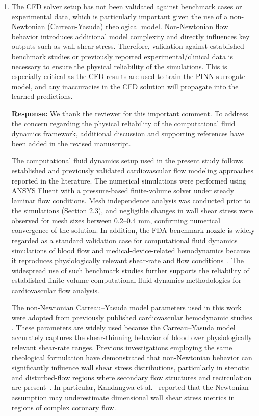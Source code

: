 \documentclass[11pt]{article}
\begin{document}
\begin{enumerate}[]
    \item The CFD solver setup has not been validated against benchmark cases or experimental data, which is particularly important given the use of a non-Newtonian (Carreau-Yasuda) rheological model. Non-Newtonian flow behavior introduces additional model complexity and directly influences key outputs such as wall shear stress. Therefore, validation against established benchmark studies or previously reported experimental/clinical data is necessary to ensure the physical reliability of the simulations. This is especially critical as the CFD results are used to train the PINN surrogate model, and any inaccuracies in the CFD solution will propagate into the learned predictions.

\textbf{Response:}
We thank the reviewer for this important comment. To address the concern regarding the physical reliability of the computational fluid dynamics framework, additional discussion and supporting references have been added in the revised manuscript.

The computational fluid dynamics setup used in the present study follows established and previously validated cardiovascular flow modeling approaches reported in the literature. The numerical simulations were performed using ANSYS Fluent with a pressure-based finite-volume solver under steady laminar flow conditions. Mesh independence analysis was conducted prior to the simulations (Section 2.3), and negligible changes in wall shear stress were observed for mesh sizes between 0.2--0.4 mm, confirming numerical convergence of the solution. In addition, the FDA benchmark nozzle is widely regarded as a standard validation case for computational fluid dynamics simulations of blood flow and medical-device-related hemodynamics because it reproduces physiologically relevant shear-rate and flow conditions~\cite{FDAnozzle}. The widespread use of such benchmark studies further supports the reliability of established finite-volume computational fluid dynamics methodologies for cardiovascular flow analysis.



The non-Newtonian Carreau--Yasuda model parameters used in this work were adopted from previously published cardiovascular hemodynamic studies \cite{Lynch2022}. These parameters are widely used because the Carreau--Yasuda model accurately captures the shear-thinning behavior of blood over physiologically relevant shear-rate ranges. Previous investigations employing the same rheological formulation have demonstrated that non-Newtonian behavior can significantly influence wall shear stress distributions, particularly in stenotic and disturbed-flow regions where secondary flow structures and recirculation are present~\cite{Lynch2022,Kandangwa2022}. In particular, Kandangwa et al.~\cite{Kandangwa2022} reported that the Newtonian assumption may underestimate dimensional wall shear stress metrics in regions of complex coronary flow.



\end{enumerate}
\end{document}
